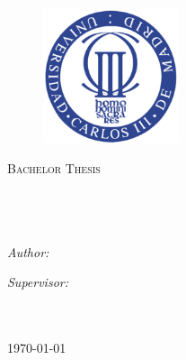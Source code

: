 \documentclass[11pt, oneside]{Thesis} %
\begin{document}
\begin{titlepage}
\begin{center}

\textsc{\LARGE \univname}\\[1.5cm] %
 
\begin{figure}[h]
\includegraphics[width=4cm]{Figures/Untitled1}
\centering
\end{figure}

\textsc{\Large Bachelor Thesis}\\[0.5cm] %

\HRule \\[0.4cm] %
{\huge \bfseries \ttitle}\\[0.4cm] %
\HRule \\[1.5cm] %
 
\begin{minipage}{0.4\textwidth}
\begin{flushleft} \large
\emph{Author:}\\
{\authornames} %
\end{flushleft}
\end{minipage}
\begin{minipage}{0.4\textwidth}
\begin{flushright} \large
\emph{Supervisor:} \\
{\supname} %
\end{flushright}
\end{minipage}\\[3cm]
 
\deptname\\ %
 
{\large \today}\\[4cm] %
 
\vfill
\end{center}

\end{titlepage}
\end{document}
